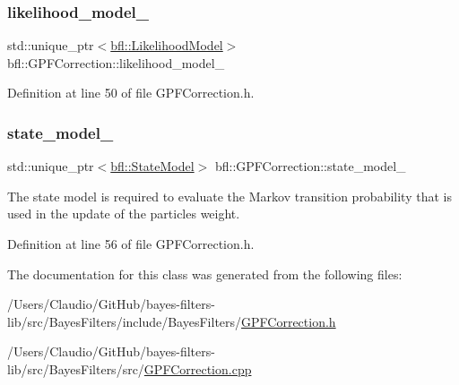 \subsubsection{\texorpdfstring{likelihood\+\_\+model\+\_\+}{likelihood\_model\_}}
{\footnotesize\ttfamily std\+::unique\+\_\+ptr$<$\mbox{\hyperlink{classbfl_1_1LikelihoodModel}{bfl\+::\+Likelihood\+Model}}$>$ bfl\+::\+G\+P\+F\+Correction\+::likelihood\+\_\+model\+\_\+\hspace{0.3cm}{\ttfamily [protected]}}



Definition at line 50 of file G\+P\+F\+Correction.\+h.

\mbox{\label{classbfl_1_1GPFCorrection_a7b979b09abf016f4e5a0d9f0d5a84917}} 
\subsubsection{\texorpdfstring{state\+\_\+model\+\_\+}{state\_model\_}}
{\footnotesize\ttfamily std\+::unique\+\_\+ptr$<$\mbox{\hyperlink{classbfl_1_1StateModel}{bfl\+::\+State\+Model}}$>$ bfl\+::\+G\+P\+F\+Correction\+::state\+\_\+model\+\_\+\hspace{0.3cm}{\ttfamily [protected]}}



The state model is required to evaluate the Markov transition probability that is used in the update of the particles weight. 



Definition at line 56 of file G\+P\+F\+Correction.\+h.



The documentation for this class was generated from the following files\+:\begin{DoxyCompactItemize}
\item 
/\+Users/\+Claudio/\+Git\+Hub/bayes-\/filters-\/lib/src/\+Bayes\+Filters/include/\+Bayes\+Filters/\mbox{\hyperlink{GPFCorrection_8h}{G\+P\+F\+Correction.\+h}}\item 
/\+Users/\+Claudio/\+Git\+Hub/bayes-\/filters-\/lib/src/\+Bayes\+Filters/src/\mbox{\hyperlink{GPFCorrection_8cpp}{G\+P\+F\+Correction.\+cpp}}\end{DoxyCompactItemize}
